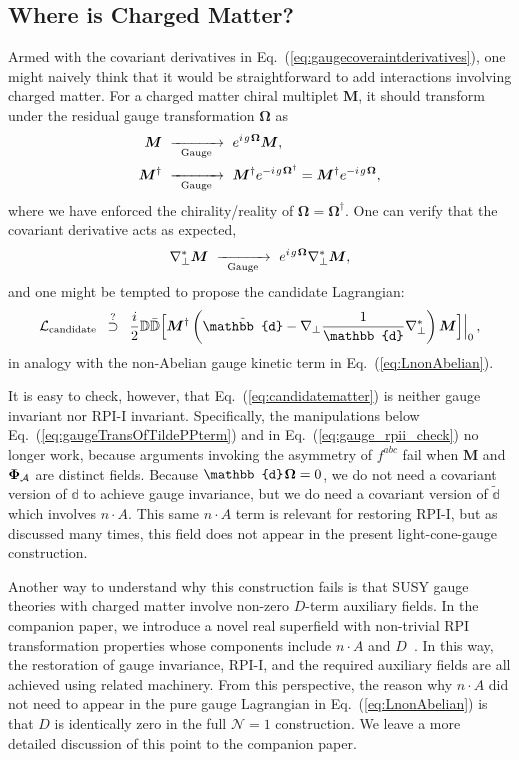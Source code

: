 \documentclass[12pt,document,nofootinbib,superscriptaddress,onecolumn,preprintnumbers,balancelastpage]{article}
\newcommand{\s}{\hspace{0.8pt}}
\newcommand{\PP}{\mathbb{d}}
\newcommand{\gauge}{\,\,\xrightarrow[\hspace{5pt}\text{Gauge}\hspace{5pt}]{}\,\,}
\DeclareRobustCommand{\Eq}[1]{Eq.~(\ref{#1})}
\newcommand{\D}{\mathbb{D}}
\newcommand{\RCA}{\boldsymbol{\Omega}}
\newcommand{\alc}{\mathcal{A}}
\newcommand{\bPhiA}{\bold \Phi_{\alc}}
\newcommand{\bM}{ \boldsymbol M}
\begin{document}
\begin{spacing}{1.2}
\subsection{Where is Charged Matter?}
\label{subsec:chargedmatter}

Armed with the covariant derivatives in \Eq{eq:gaugecoveraintderivatives}, one might naively think that it would be straightforward to add interactions involving charged matter.
%
For a charged matter chiral multiplet $\bM$, it should transform under the residual gauge transformation $\RCA$ as
%
\begin{align}
\bM  &\gauge  e^{i\s g\s \RCA} \bM,\\
\bM^\dagger   &\gauge   \bM^\dagger e^{-i\s g\s \RCA^\dagger} = \bM^\dagger e^{-i\s g\s \RCA},
\end{align}
%
where we have enforced the chirality/reality of $\RCA = \RCA^\dagger$. 
%
One can verify that the covariant derivative acts as expected,
%
\begin{align}
\nabla_\perp^* \bM  \gauge  e^{i\s g\s \RCA} \nabla_\perp^* \bM,
\end{align}
and one might be tempted to propose the candidate Lagrangian:
%
\begin{equation}
\label{eq:candidatematter}
\mathcal{L}_{\text{candidate}} \,\,\,  \stackrel{?}{\supset} \,\,\, \frac{i}{2} \D \bar{\D} \Bigl[ \bM^\dagger  \left( \tilde{\PP}  - \nabla_\perp \frac{1}{\PP} \nabla_\perp^* \right)  \bM \Bigr] \Big|_{0}  \,,
\end{equation}
in analogy with the non-Abelian gauge kinetic term in \Eq{eq:LnonAbelian}.


It is easy to check, however, that \Eq{eq:candidatematter} is neither gauge invariant nor RPI-I invariant.
%
Specifically, the manipulations below \Eq{eq:gaugeTransOfTildePPterm} and in \Eq{eq:gauge_rpii_check} no longer work, because arguments invoking the asymmetry of $f^{abc}$ fail when $\bM$ and $\bPhiA$ are distinct fields.
%
Because $\PP\s \RCA = 0$, we do not need a covariant version of $\PP$ to achieve gauge invariance, but we do need a covariant version of $\tilde{\PP}$ which involves $n \cdot A$.
%
This same $n \cdot A$ term is relevant for restoring RPI-I, but as discussed many times, this field does not appear in the present light-cone-gauge construction.


Another way to understand why this construction fails is that SUSY gauge theories with charged matter involve non-zero $D$-term auxiliary fields.
%
In the companion paper, we introduce a novel real superfield with non-trivial RPI transformation properties whose components include $n \cdot A$ and $D$~\cite{Cohen:2019gsc}.
%
In this way, the restoration of gauge invariance, RPI-I, and the required auxiliary fields are all achieved using related machinery.
%
From this perspective, the reason why $n \cdot A$ did not need to appear in the pure gauge Lagrangian in \Eq{eq:LnonAbelian} is that $D$ is identically zero in the full $\mathcal{N} = 1$ construction.
%
We leave a more detailed discussion of this point to the companion paper.



\end{spacing}
\end{document}
